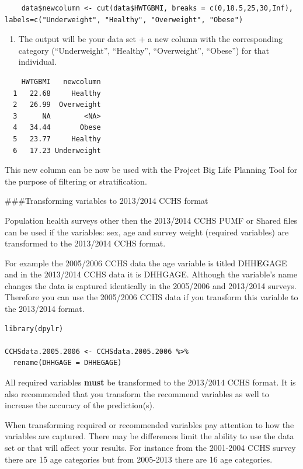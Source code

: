 \documentclass[]{book}
\providecommand{\tightlist}{%
  \setlength{\itemsep}{0pt}\setlength{\parskip}{0pt}}
\begin{document}
\begin{verbatim}
    data$newcolumn <- cut(data$HWTGBMI, breaks = c(0,18.5,25,30,Inf),  labels=c("Underweight", "Healthy", "Overweight", "Obese")
\end{verbatim}

\begin{enumerate}
\def\labelenumi{\arabic{enumi}.}
\setcounter{enumi}{3}
\tightlist
\item
  The output will be your data set + a new column with the corresponding category (``Underweight'', ``Healthy'', ``Overweight'', ``Obese'') for that individual.
\end{enumerate}

\begin{verbatim}
    HWTGBMI   newcolumn
  1   22.68     Healthy
  2   26.99  Overweight
  3      NA        <NA>
  4   34.44       Obese
  5   23.77     Healthy
  6   17.23 Underweight
\end{verbatim}

This new column can be now be used with the Project Big Life Planning Tool for the purpose of filtering or stratification.

\#\#\#Transforming variables to 2013/2014 CCHS format

Population health surveys other then the 2013/2014 CCHS PUMF or Shared files can be used if the variables: sex, age and survey weight (required variables) are transformed to the 2013/2014 CCHS format.

For example the 2005/2006 CCHS data the age variable is titled DHH\textbf{E}GAGE and in the 2013/2014 CCHS data it is DHHGAGE. Although the variable's name changes the data is captured identically in the 2005/2006 and 2013/2014 surveys. Therefore you can use the 2005/2006 CCHS data if you transform this variable to the 2013/2014 format.

\begin{verbatim}
library(dpylr)

CCHSdata.2005.2006 <- CCHSdata.2005.2006 %>% 
  rename(DHHGAGE = DHHEGAGE)
\end{verbatim}

All required variables \textbf{must} be transformed to the 2013/2014 CCHS format. It is also recommended that you transform the recommend variables as well to increase the accuracy of the prediction(s).

When transforming required or recommended variables pay attention to how the variables are captured. There may be differences limit the ability to use the data set or that will affect your results. For instance from the 2001-2004 CCHS survey there are 15 age categories but from 2005-2013 there are 16 age categories.
\end{document}
